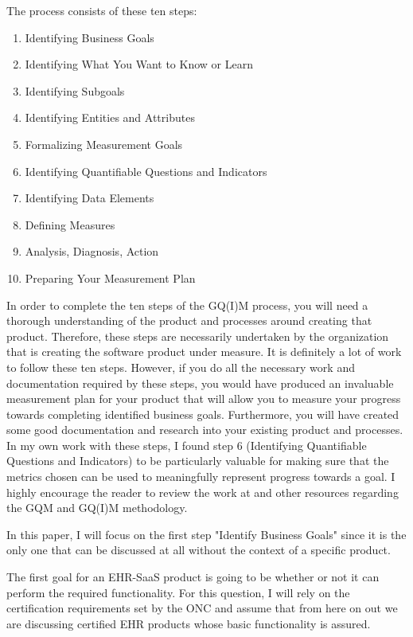 \documentclass[10pt]{article}
\begin{document}
The process consists of these ten steps:
\begin{enumerate}
	\item Identifying Business Goals
	\item Identifying What You Want to Know or Learn 
	\item Identifying Subgoals
	\item Identifying Entities and Attributes
	\item Formalizing Measurement Goals
	\item Identifying Quantifiable Questions and Indicators 
	\item Identifying Data Elements
	\item Defining Measures
	\item Analysis, Diagnosis, Action
	\item Preparing Your Measurement Plan
\end{enumerate}

In order to complete the ten steps of the GQ(I)M process, you will need a thorough understanding of the product and processes around creating that product.
Therefore, these steps are necessarily undertaken by the organization that is creating the software product under measure.
It is definitely a lot of work to follow these ten steps.
However, if you do all the necessary work and documentation required by these steps, you would have produced an invaluable measurement plan for your product that will allow you to measure your progress towards completing identified business goals.
Furthermore, you will have created some good documentation and research into your existing product and processes.
In my own work with these steps, I found step 6 (Identifying Quantifiable Questions and Indicators) to be particularly valuable for making sure that the metrics chosen can be used to meaningfully represent progress towards a goal.
I highly encourage the reader to review the work at \cite{sei-gqim} and other resources regarding the GQM and GQ(I)M methodology.

In this paper, I will focus on the first step "Identify Business Goals" since it is the only one that can be discussed at all without the context of a specific product.

The first goal for an EHR-SaaS product is going to be whether or not it can perform the required functionality.
For this question, I will rely on the certification requirements set by the ONC and assume that from here on out we are discussing certified EHR products whose basic functionality is assured.
\end{document}
